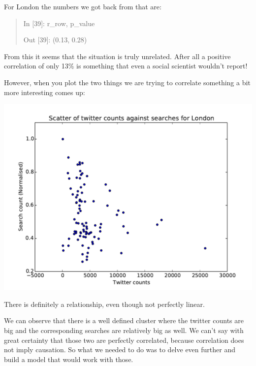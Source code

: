 \documentclass[minf,frontabs,twoside,singlespacing,parskip]{infthesis}
\begin{document}
For London the numbers we got back from that are:
\begin{quotation}
In [39]: r\_row, p\_value

Out [39]: (0.13, 0.28)
\end{quotation}

From this it seems that the situation is truly unrelated. After all a positive correlation of only 13\% is something that even a social scientist wouldn't report!

However, when you plot the two things we are trying to correlate something a bit more interesting comes up:

\includegraphics[width=\textwidth]{London}

There is definitely a relationship, even though not perfectly linear.

We can observe that there is a well defined cluster where the twitter counts are big and the corresponding searches are relatively big as well. We can't say with great certainty that those two are perfectly correlated, because correlation does not imply causation. So what we needed to do was to delve even further and build a model that would work with those.

\end{document}
